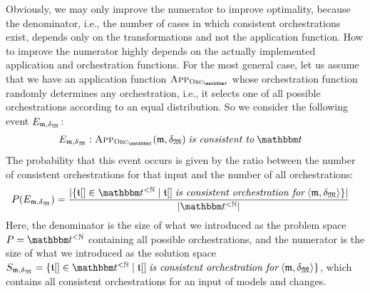 Obviously, we may only improve the numerator to improve optimality, because the denominator, i.e., the number of cases in which consistent orchestrations exist, depends only on the transformations and not the application function.
How to improve the numerator highly depends on the actually implemented application and orchestration functions.
For the most general case, let us assume that we have an application function $\appfunction{\orcfunction{\transformationset{T}}}$ whose orchestration function randomly determines any orchestration, i.e., it selects one of all possible orchestrations according to an equal distribution.
So we consider the following event $E_{\modeltuple{m},\changetuple{\metamodeltuple{M}}}$:
\begin{align*}
    &
    E_{\modeltuple{m},\changetuple{\metamodeltuple{M}}}: \appfunction{\orcfunction{\transformationset{T}}}(\modeltuple{m}, \changetuple{\metamodeltuple{M}}) \mathtextspacearound{is consistent to} \transformationset{T}
\end{align*}
The probability that this event occurs is given by the ratio between the number of consistent orchestrations for that input and the number of all orchestrations:
\begin{align*}
    &
    P(E_{\modeltuple{m},\changetuple{\metamodeltuple{M}}}) = \frac{
        \abs{\setted{\sequence{\transformation{t}} \in \transformationset{T}^{< \mathbb{N}} \mid \sequence{\transformation{t}} \mathtextspacearound{is consistent orchestration for} \tupled{\modeltuple{m}, \changetuple{\metamodeltuple{M}}}}}
    }{
        \abs{\transformationset{T}^{< \mathbb{N}}}
    }
\end{align*}
Here, the denominator is the size of what we introduced as the problem space $P = \transformationset{T}^{< \mathbb{N}}$ containing all possible orchestrations, and the numerator is the size of what we introduced as the solution space $S_{\modeltuple{m}, \changetuple{\metamodeltuple{M}}} = \setted{\sequence{\transformation{t}} \in \transformationset{T}^{< \mathbb{N}} \mid \sequence{\transformation{t}} \mathtextspacearound{is consistent orchestration for} \tupled{\modeltuple{m}, \changetuple{\metamodeltuple{M}}}}$, which contains all consistent orchestrations for an input of models and changes.

